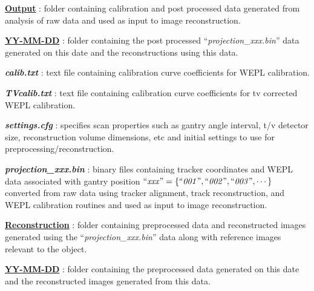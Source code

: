 \documentclass[landscape]{article}
\begin{document}
\begin{myEnumerate}[labelindent=0pt, leftmargin=*]
\begin{myEnumerate}[labelindent=1pt, leftmargin=*]
\begin{myEnumerate}[labelindent=1pt, leftmargin=*]
\begin{myEnumerate}[labelindent=1pt, leftmargin=*]
\begin{myEnumerate}[labelindent=1pt, leftmargin=*]
\begin{myEnumerate}[labelindent=1pt, leftmargin=*]
                    \end{myEnumerate}
                    \item \ul{\textbf{Output}} : folder containing calibration and post processed data generated from analysis of raw data and used as input to image reconstruction.
                    \begin{myEnumerate}[labelindent=1pt, leftmargin=*]
                        \item \ul{\textbf{YY-MM-DD}} : folder containing the post processed ``\textit{projection\_xxx.bin}'' data generated on this date and the reconstructions using this data.
                        \begin{myEnumerate}[labelindent=1pt, leftmargin=*]
                            \item \textbf{\textit{calib.txt}} : text file containing calibration curve coefficients for WEPL calibration.
                            \item \textbf{\textit{TVcalib.txt}} : text file containing calibration curve coefficients for tv corrected WEPL calibration.
                            \item \textbf{\textit{settings.cfg}} : specifies scan properties such as gantry angle interval, t/v detector size, reconstruction volume dimensions, etc and initial settings to use for preprocessing/reconstruction.
                            \item \textbf{\textit{projection\_xxx.bin}} : binary files containing tracker coordinates and WEPL data associated with gantry position $\textrm{``\textit{xxx}''} =\{\textrm{``\textit{001}''}, \textrm{``\textit{002}''}, \textrm{``\textit{003}''}, \cdots\}$ converted from raw data using tracker alignment, track reconstruction, and WEPL calibration routines and used as input to image reconstruction.
                            \item \ul{\textbf{Reconstruction}} : folder containing preprocessed data and reconstructed images generated using the ``\textit{projection\_xxx.bin}'' data along with reference images relevant to the object.
                            \begin{myEnumerate}[labelindent=1pt, leftmargin=*]
                                \item \ul{\textbf{YY-MM-DD}} : folder containing the preprocessed data generated on this date and the reconstructed images generated from this data.
                                \begin{myEnumerate}[labelindent=1pt, leftmargin=*]

\end{myEnumerate}
\end{myEnumerate}
\end{myEnumerate}
\end{myEnumerate}
\end{myEnumerate}
\end{myEnumerate}
\end{myEnumerate}
\end{myEnumerate}
\end{myEnumerate}
\end{document}
